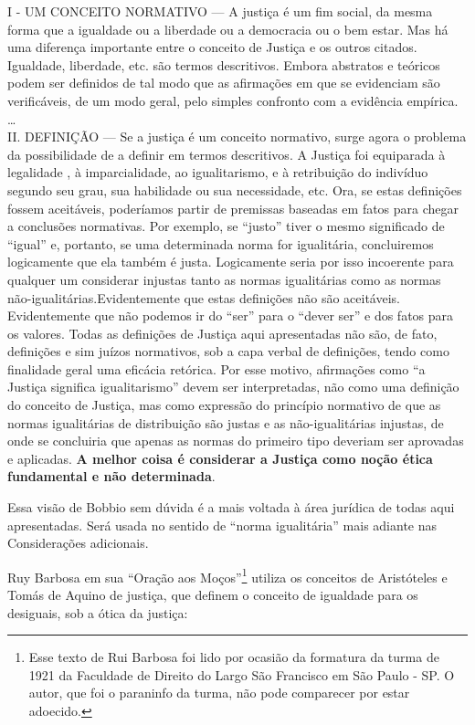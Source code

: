 \documentclass[
	12pt,				%
	openright,			%
	twoside,			%
	a4paper,			%
	chapter=TITLE,		%
	section=TITLE,		%
	subsection=TITLE,	%
	subsubsection=TITLE,%
	spanish,            %
	english,			%
	brazil				%
	]{abntex2}
\begin{document}
\begin{citacao}
	I - UM CONCEITO NORMATIVO --- A justiça é um fim social, da mesma forma que a igualdade ou a liberdade ou a democracia ou o bem estar. Mas há uma diferença importante  entre o conceito de Justiça e os outros citados. Igualdade, liberdade, etc. são termos descritivos. Embora abstratos e teóricos podem ser definidos de tal modo que as afirmações em que se evidenciam são verificáveis, de um modo geral, pelo simples confronto com a evidência empírica.\\
	\ldots \\
	II. DEFINIÇÃO --- Se a justiça é um conceito normativo, surge agora o problema da possibilidade de a definir em termos descritivos. A Justiça foi equiparada à legalidade , à imparcialidade, ao igualitarismo, e à retribuição do indivíduo segundo seu grau, sua habilidade ou sua necessidade, etc. Ora, se estas definições fossem aceitáveis, poderíamos partir de premissas baseadas em fatos para chegar a conclusões normativas. Por exemplo, se “justo” tiver o mesmo significado de “igual” e, portanto, se uma determinada norma for igualitária, concluiremos logicamente que ela também é justa. Logicamente seria por isso incoerente para qualquer um considerar injustas tanto as normas igualitárias como as normas não-igualitárias.Evidentemente que estas definições não são aceitáveis. Evidentemente que não podemos ir do “ser” para o “dever ser” e dos fatos para os valores. Todas as definições de Justiça aqui apresentadas não são, de fato, definições e sim juízos normativos, sob a capa verbal de definições, tendo como finalidade geral uma eficácia retórica. Por esse motivo, afirmações como “a Justiça significa igualitarismo” devem ser interpretadas, não como uma definição do conceito de Justiça, mas como expressão do princípio normativo de que as normas igualitárias de distribuição são justas e as não-igualitárias injustas, de onde se concluiria que apenas as normas do primeiro tipo deveriam ser aprovadas e aplicadas. \textbf{A melhor coisa é considerar a Justiça como noção ética fundamental e não determinada}.\cite[p. ~660, grifo do autor]{Bobbio2007}
\end{citacao}
\par
Essa visão de Bobbio sem dúvida é a mais voltada à área jurídica de todas aqui apresentadas. Será usada no sentido de “norma igualitária” mais adiante nas Considerações adicionais.
\par
Ruy Barbosa em sua “Oração aos Moços”\footnote{Esse texto de Rui Barbosa foi lido por ocasião da formatura da turma de 1921 da Faculdade de Direito do Largo São Francisco em São Paulo - SP. O autor, que foi o paraninfo da turma, não pode comparecer por estar adoecido.}  utiliza os conceitos de Aristóteles e Tomás de Aquino de justiça, que definem o conceito de igualdade para os desiguais, sob a ótica da justiça:
\end{document}
